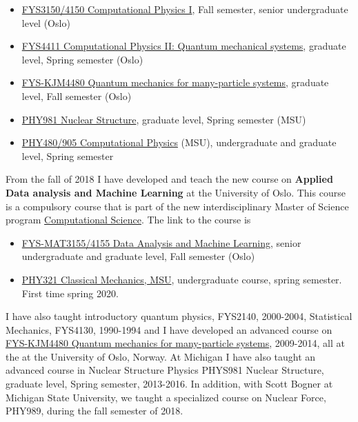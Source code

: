 \documentclass[%
oneside,                 %
final,                   %
10pt]{article}
\begin{document}
\begin{itemize}
\item \href{{http://www.uio.no/studier/emner/matnat/fys/FYS3150/}}{FYS3150/4150 Computational Physics I}, Fall semester, senior undergraduate level (Oslo) 

\item \href{{http://www.uio.no/studier/emner/matnat/fys/FYS4411/}}{FYS4411 Computational Physics II: Quantum mechanical systems}, graduate level, Spring semester (Oslo) 

\item \href{{http://www.uio.no/studier/emner/matnat/fys/FYS-kJM4480/}}{FYS-KJM4480 Quantum mechanics for many-particle systems}, graduate level, Fall semester (Oslo) 

\item \href{{https://github.com/NuclearStructure/PHY981}}{PHY981 Nuclear Structure}, graduate level, Spring semester (MSU) 

\item \href{{https://github.com/CompPhysics/ComputationalPhysicsMSU}}{PHY480/905 Computational Physics} (MSU), undergraduate and graduate level, Spring semester
\end{itemize}

\noindent
From the fall of 2018 I have developed and teach the new course on \textbf{Applied Data analysis and Machine Learning} at the University of Oslo. This course is a compulsory course that is part of the new interdisciplinary Master of Science program \href{{http://www.uio.no/english/studies/programmes/computational-science-master/index.html}}{Computational Science}. The link to the course is
\begin{itemize}
\item \href{{http://www.uio.no/studier/emner/matnat/fys/FYS-MAT4155/}}{FYS-MAT3155/4155 Data Analysis and Machine Learning}, senior undergraduate and graduate level, Fall semester (Oslo) 

\item \href{{https://github.com/mhjensen/Physics321}}{PHY321 Classical Mechanics, MSU}, undergraduate course, spring semester. First time spring 2020. 
\end{itemize}

\noindent
I have also taught introductory quantum physics, FYS2140, 2000-2004, Statistical Mechanics, FYS4130, 1990-1994 and I have developed an advanced course on \href{{http://www.uio.no/studier/emner/matnat/fys/FYS-kjm4480/}}{FYS-KJM4480 Quantum mechanics for many-particle systems}, 2009-2014, all at the at the University of Oslo, Norway. At Michigan I have also taught an advanced course in Nuclear Structure Physics PHYS981 Nuclear Structure, graduate level, Spring semester, 2013-2016. In addition, with Scott Bogner at Michigan State University, we taught a specialized course on Nuclear Force, PHY989, during the fall semester of 2018.
\end{document}
